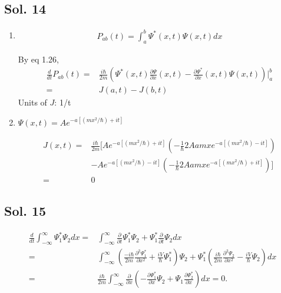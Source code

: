 \subsection*{Sol. 14}
\begin{enumerate}
    \item 
    \begin{align*}
    P_{ab}(t) = 
    \int_a^b\Psi^*(x,t)\Psi(x,t) dx
\end{align*}


By eq 1.26,
\begin{align*}
    \frac{d}{dt}
    P_{ab}(t) =& 
    \frac{i\hbar}{2m}
    \left(
    \Psi^*(x,t)
    \frac{\partial \Psi}{\partial x}(x,t)
    -
    \frac{\partial \Psi^*}{\partial x}(x,t)
    \Psi(x,t)
    \right)\bigg|_a^b\\
    = & J(a,t) - J(b, t)
\end{align*}
Units of $J$: 1/t
\item 
$\Psi(x,t) =A e^{-a[(mx^2/\hbar)+it]}$

\begin{align*}
    J(x,t)
    = & \frac{i\hbar}{2m}
    [ 
    A e^{-a[(mx^2/\hbar)+it]}
    (-\frac{1}{\hbar}2Aamxe^{-a[(mx^2/\hbar)-it]})
    \\ & - 
    A e^{-a[(mx^2/\hbar)-it]}
    (-\frac{1}{\hbar}2Aamxe^{-a[(mx^2/\hbar)+it]})
    ]\\
    =& 0
\end{align*}

\end{enumerate}


\subsection*{Sol. 15}
\begin{align*}
    \frac{d}{dt}\int_{-\infty}^{\infty}
    \Psi_1^*\Psi_2dx
    = & 
    \int_{-\infty}^{\infty}
    \frac{\partial}{\partial t}
    \Psi^*_1 \Psi_2 + 
    \Psi_1^* \frac{\partial}{\partial t} \Psi_2 dx\\
    =& \int_{-\infty}^{\infty}
    (\frac{-i\hbar}{2m}\frac{\partial^2\Psi_1^*}{\partial x^2} + \frac{iV}{\hbar}\Psi_1^*)\Psi_2
    +
    \Psi_1^*(\frac{i\hbar}{2m}\frac{\partial^2\Psi_2}{\partial x^2} - \frac{iV}{\hbar}\Psi_2)dx\\
    =& \frac{i\hbar}{2m}\int_{-\infty}^{\infty}
    \frac{\partial}{\partial x}(
    -\frac{\partial \Psi_1^*}{\partial x}\Psi_2
    + \Psi_1\frac{\partial \Psi_2^*}{\partial x}
    )dx = 0.
\end{align*}

